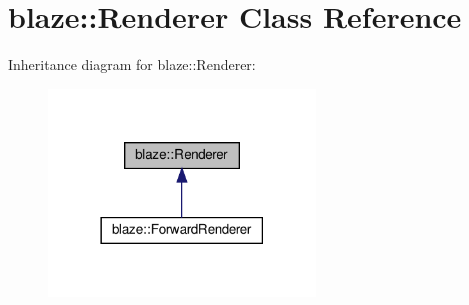 \hypertarget{classblaze_1_1Renderer}{}\section{blaze\+:\+:Renderer Class Reference}
\label{classblaze_1_1Renderer}


Inheritance diagram for blaze\+:\+:Renderer\+:\nopagebreak
\begin{figure}[H]
\begin{center}
\leavevmode
\includegraphics[width=201pt]{classblaze_1_1Renderer__inherit__graph}
\end{center}
\end{figure}
